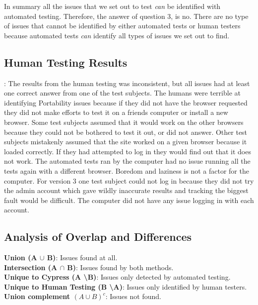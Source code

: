 \documentclass[journal,twocolumn]{IEEEtran}
\begin{document}
In summary all the issues that we set out to test \textit{can} be identified with automated testing. %
Therefore, the answer of question 3, is no. There are no type of issues that cannot be identified by either automated tests or human testers because automated tests \textit{can} identify all types of issues we set out to find.

\subsection{Human Testing Results}:
The results from the human testing was inconsistent, but all issues had at least one correct answer from one of the test subjects. The humans were terrible at identifying Portability issues because if they did not have the browser requested they did not make efforts to test it on a friends computer or install a new browser. Some test subjects assumed that it would work on the other browsers because they could not be bothered to test it out, or did not answer. Other test subjects mistakenly assumed that the site worked on a given browser because it loaded correctly. If they had attempted to log in they would find out that it does not work. The automated tests ran by the computer had no issue running all the tests again with a different browser. Boredom and laziness is not a factor for the computer. For version 3 one test subject could not log in because they did not try the admin account which gave wildly inaccurate results and tracking the biggest fault would be difficult. The computer did not have any issue logging in with each account. %

\subsection{Analysis of Overlap and Differences}
\textbf{Union (A $\cup$ B)}: Issues found at all. \\
\textbf{Intersection (A $\cap$ B)}: Issues found by both methods. \\
\textbf{Unique to Cypress (A \textbackslash B)}: Issues only detected by automated testing. \\
\textbf{Unique to Human Testing (B \textbackslash A)}: Issues only identified by human testers. \\
\textbf{Union complement $(A \cup B)^c$}: Issues not found.
\end{document}
